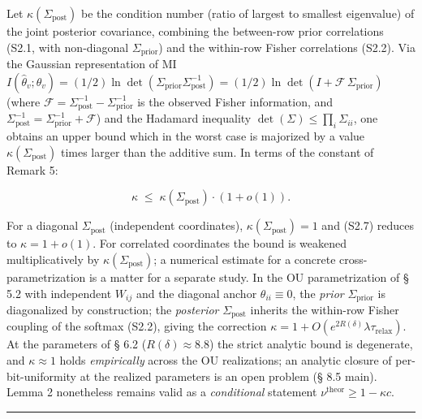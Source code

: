 \documentclass[pdflatex,sn-mathphys-ay]{sn-jnl}
\begin{document}
Let \(\kappa(\Sigma_{\text{post}})\) be the condition number (ratio of largest to smallest eigenvalue) of the joint posterior covariance, combining the between-row prior correlations (S2.1, with non-diagonal \(\Sigma_{\text{prior}}\)) and the within-row Fisher correlations (S2.2). Via the Gaussian representation of MI \(I(\hat\theta_v; \theta_v) = (1/2) \ln \det(\Sigma_{\text{prior}} \Sigma_{\text{post}}^{-1}) = (1/2) \ln \det(I + \mathcal{F}\,\Sigma_{\text{prior}})\) (where \(\mathcal{F} = \Sigma_{\text{post}}^{-1} - \Sigma_{\text{prior}}^{-1}\) is the observed Fisher information, and \(\Sigma_{\text{post}}^{-1} = \Sigma_{\text{prior}}^{-1} + \mathcal{F}\)) and the Hadamard inequality \(\det(\Sigma) \le \prod_i \Sigma_{ii}\), one obtains an upper bound which in the worst case is majorized by a value \(\kappa(\Sigma_{\text{post}})\) times larger than the additive sum. In terms of the constant of Remark 5:



\begin{equation}\kappa \;\le\; \kappa(\Sigma_{\text{post}}) \cdot (1 + o(1)). \tag{S2.7}\end{equation}



For a diagonal \(\Sigma_{\text{post}}\) (independent coordinates), \(\kappa(\Sigma_{\text{post}}) = 1\) and (S2.7) reduces to \(\kappa = 1 + o(1)\). For correlated coordinates the bound is weakened multiplicatively by \(\kappa(\Sigma_{\text{post}})\); a numerical estimate for a concrete cross-parametrization is a matter for a separate study. In the OU parametrization of § 5.2 with independent \(W_{ij}\) and the diagonal anchor \(\theta_{ii} \equiv 0\), the \emph{prior} \(\Sigma_{\text{prior}}\) is diagonalized by construction; the \emph{posterior} \(\Sigma_{\text{post}}\) inherits the within-row Fisher coupling of the softmax (S2.2), giving the correction \(\kappa = 1 + O(e^{2R(\delta)}\lambda\tau_{\text{relax}})\). At the parameters of § 6.2 (\(R(\delta) \approx 8.8\)) the strict analytic bound is degenerate, and \(\kappa \approx 1\) holds \emph{empirically} across the OU realizations; an analytic closure of per-bit-uniformity at the realized parameters is an open problem (§ 8.5 main). Lemma 2 nonetheless remains valid as a \emph{conditional} statement \(\nu^{\text{theor}} \ge 1 - \kappa c\).



\begin{center}\rule{0.5\linewidth}{0.5pt}\end{center}
\end{document}
